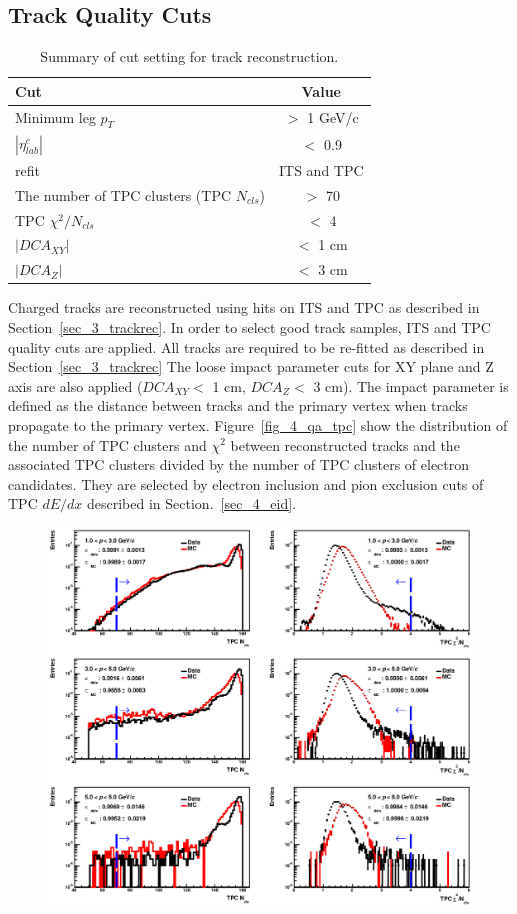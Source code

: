 {\subsection{Track Quality Cuts}
\begin{table}[!h]
  \centering
  \begin{tabular}{lc} \hline
    Cut   & Value \\ \hline
    Minimum leg $p_{T}$  & $>$ 1 GeV/c \\ \hline
    $|\eta^{e}_{lab}|$  & $<$ 0.9 \\ \hline
    refit  &  ITS and TPC\\ \hline
    The number of TPC clusters (TPC $N_{cls}$) & $>$ 70 \\ \hline
    TPC $\chi^{2}/N_{cls}$ & $<$ 4 \\ \hline
    $|DCA_{XY}|$ & $<$ 1 cm \\ \hline
    $|DCA_{Z}|$ & $<$ 3 cm \\ \hline
  \end{tabular}  
  \caption{Summary of cut setting for track reconstruction. }
\label{table_4_trackquality}
\end{table}
Charged tracks are reconstructed using hits on ITS and TPC as described in Section~\ref{sec_3_trackrec}.
In order to select good track samples, ITS and TPC quality cuts are applied. 
All tracks are required to be re-fitted as described in Section~\ref{sec_3_trackrec}
The loose impact parameter cuts for XY plane and Z axis are also applied ($DCA_{XY} <$ 1 cm, $DCA_{Z} < $ 3 cm).  
The impact parameter is defined as the distance between tracks and the primary vertex when tracks propagate to the primary vertex.  
Figure~\ref{fig_4_qa_tpc} show the distribution of the number of TPC clusters and $\chi^{2}$ between reconstructed tracks and the associated TPC clusters divided by the number of TPC clusters of electron candidates. 
They are selected by electron inclusion and pion exclusion cuts of TPC $dE/dx$ described in Section.~\ref{sec_4_eid}. 
\begin{figure}[!h]
  \centering
  \includegraphics[width=15cm]{chap4/figure/TrackQA/TPCNclsandChi2_LHC13befix2.eps}

\end{figure}}
